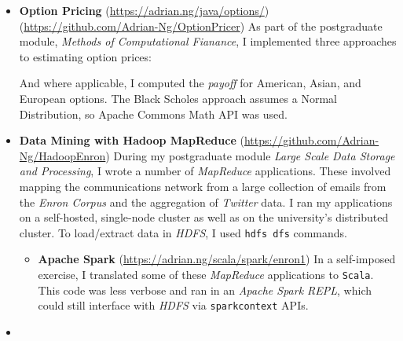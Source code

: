 \documentclass[letterpaper,11pt]{article}
\begin{document}
\begin{itemize}
{	      }
	\item
	      {
	      \textbf{Option Pricing}
	      \hfill
	      \tiny
	      (\href{https://adrian.ng/java/options/}{https://adrian.ng/java/options/}) \quad (\href{https://github.com/Adrian-Ng/OptionPricer}{https://github.com/Adrian-Ng/OptionPricer})
	      \newline
	      \small
	      As part of the postgraduate module, \textit{Methods of Computational Fianance}, I implemented three approaches to estimating option prices:
	      And where applicable, I computed the \textit{payoff} for American, Asian, and European options.
	      The Black Scholes approach assumes a Normal Distribution, so Apache Commons Math API was used.
	      }
	\item
	      {
	      \textbf{Data Mining with Hadoop MapReduce}
	      \hfill
	      \tiny
	      (\href{https://github.com/Adrian-Ng/HadoopEnron}{https://github.com/Adrian-Ng/HadoopEnron})
	      \small
	      \newline
	      During my postgraduate module \textit{Large Scale Data Storage and Processing}, I wrote a number of \textit{MapReduce} applications. These involved mapping the communications network from a large collection of emails from the \textit{Enron Corpus} and the aggregation of \textit{Twitter} data.
	      I ran my applications on a self-hosted, single-node cluster as well as on the university's distributed cluster. To load/extract data in \textit{HDFS}, I used \texttt{hdfs dfs} commands.
	      \begin{itemize}
		      \item
		            \textbf{Apache Spark}
		            \hfill
		            \tiny
		            (\href{https://adrian.ng/scala/spark/enron1}{https://adrian.ng/scala/spark/enron1})
		            \small
		            \newline
		            In a self-imposed exercise, I translated some of these \textit{MapReduce} applications to \texttt{Scala}. This code was less verbose and ran in an \textit{Apache Spark REPL}, which could still interface with \textit{HDFS} via \texttt{sparkcontext} APIs.
	      \end{itemize}
	      }
	\item {
}
\end{itemize}
\end{document}
